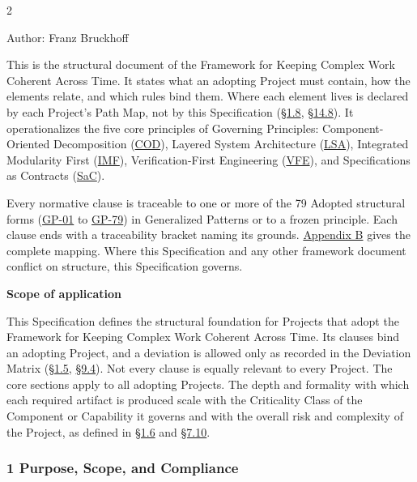 \begin{multicols}{2}

\par\medskip

Author: Franz Bruckhoff

This is the structural document of the Framework for Keeping Complex Work Coherent Across Time. It states what an adopting Project must contain, how the elements relate, and which rules bind them. Where each element lives is declared by each Project's Path Map, not by this Specification (\hyperlink{nss-1.8}{\S1.8}, \hyperlink{nss-14.8}{\S14.8}). It operationalizes the five core principles of Governing Principles: Component-Oriented Decomposition (\hyperlink{gp-COD}{COD}), Layered System Architecture (\hyperlink{gp-LSA}{LSA}), Integrated Modularity First (\hyperlink{gp-IMF}{IMF}), Verification-First Engineering (\hyperlink{gp-VFE}{VFE}), and Specifications as Contracts (\hyperlink{gp-SaC}{SaC}).

Every normative clause is traceable to one or more of the 79 Adopted structural forms (\hyperlink{gp-01}{GP-01} to \hyperlink{gp-79}{GP-79}) in Generalized Patterns or to a frozen principle. Each clause ends with a traceability bracket naming its grounds. \hyperlink{nss-appB}{Appendix B} gives the complete mapping. Where this Specification and any other framework document conflict on structure, this Specification governs.

\textbf{Scope of application}

This Specification defines the structural foundation for Projects that adopt the Framework for Keeping Complex Work Coherent Across Time. Its clauses bind an adopting Project, and a deviation is allowed only as recorded in the Deviation Matrix (\hyperlink{nss-1.5}{\S1.5}, \hyperlink{nss-9.4}{\S9.4}). Not every clause is equally relevant to every Project. The core sections apply to all adopting Projects. The depth and formality with which each required artifact is produced scale with the Criticality Class of the Component or Capability it governs and with the overall risk and complexity of the Project, as defined in \hyperlink{nss-1.6}{\S1.6} and \hyperlink{nss-7.10}{\S7.10}.

\hypertarget{nss-1}{}

\subsubsection*{1 Purpose, Scope, and Compliance}


\end{multicols}
